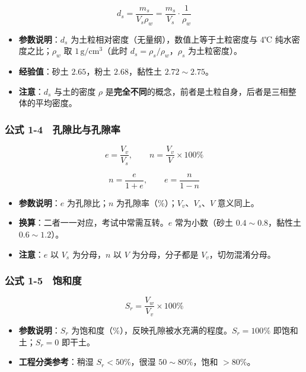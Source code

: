 \documentclass[
]{article}
\providecommand{\tightlist}{%
  \setlength{\itemsep}{0pt}\setlength{\parskip}{0pt}}
\begin{document}
\[d_s=\frac{m_s}{V_s\rho_w}=\frac{m_s}{V_s}\cdot\frac{1}{\rho_w}\]

\begin{itemize}
\tightlist
\item
  \textbf{参数说明}：\(d_s\)
  为土粒相对密度（无量纲），数值上等于土粒密度与 4℃
  纯水密度之比；\(\rho_w\) 取 \(1\,\mathrm{g/cm^3}\)（此时
  \(d_s=\rho_s/\rho_w\)，\(\rho_s\) 为土粒密度）。
\item
  \textbf{经验值}：砂土 \(2.65\)，粉土 \(2.68\)，黏性土
  \(2.72\sim2.75\)。
\item
  \textbf{注意}：\(d_s\) 与土的密度 \(\rho\)
  是\textbf{完全不同}的概念，前者是土粒自身，后者是三相整体的平均密度。
\end{itemize}

\subsubsection{公式
1-4　孔隙比与孔隙率}\label{ux516cux5f0f-1-4-ux5b54ux9699ux6bd4ux4e0eux5b54ux9699ux7387}

\[e=\frac{V_v}{V_s},\qquad n=\frac{V_v}{V}\times100\%\]

\[n=\frac{e}{1+e},\qquad e=\frac{n}{1-n}\]

\begin{itemize}
\tightlist
\item
  \textbf{参数说明}：\(e\) 为孔隙比；\(n\)
  为孔隙率（\%）；\(V_v\)、\(V_s\)、\(V\) 意义同上。
\item
  \textbf{换算}：二者一一对应，考试中常需互转。\(e\) 常为小数（砂土
  \(0.4\sim0.8\)，黏性土 \(0.6\sim1.2\)）。
\item
  \textbf{注意}：\(e\) 以 \(V_s\) 为分母，\(n\) 以 \(V\)
  为分母，分子都是 \(V_v\)，切勿混淆分母。
\end{itemize}

\subsubsection{公式
1-5　饱和度}\label{ux516cux5f0f-1-5-ux9971ux548cux5ea6}

\[S_r=\frac{V_w}{V_v}\times100\%\]

\begin{itemize}
\tightlist
\item
  \textbf{参数说明}：\(S_r\)
  为饱和度（\%），反映孔隙被水充满的程度。\(S_r=100\%\)
  即饱和土；\(S_r=0\) 即干土。
\item
  \textbf{工程分类参考}：稍湿 \(S_r<50\%\)，很湿 \(50\sim80\%\)，饱和
  \(>80\%\)。
\end{itemize}
\end{document}
